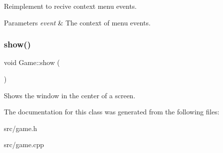 Reimplement to recive context menu events. 


\begin{DoxyParams}{Parameters}
{\em event} & The context of menu events. \\
\hline
\end{DoxyParams}
\mbox{\label{class_game_ada0891dcd00cd18026915f7dfcdde2b6}} 
\subsubsection{\texorpdfstring{show()}{show()}}
{\footnotesize\ttfamily void Game\+::show (\begin{DoxyParamCaption}{ }\end{DoxyParamCaption})}



Shows the window in the center of a screen. 



The documentation for this class was generated from the following files\+:\begin{DoxyCompactItemize}
\item 
src/game.\+h\item 
src/game.\+cpp\end{DoxyCompactItemize}
